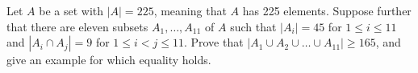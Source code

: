 Let $A$ be a set with $|A|=225$,  meaning that $A$ has 225 elements.  Suppose further that there are eleven subsets $A_1, \ldots, A_{11}$ of $A$ such that $|A_i|=45$ for $1\leq i\leq11$ and $|A_i\cap A_j|=9$ for $1\leq i<j\leq11$.  Prove that $|A_1\cup A_2\cup\ldots\cup A_{11}|\geq 165$,  and give an example for which equality holds.